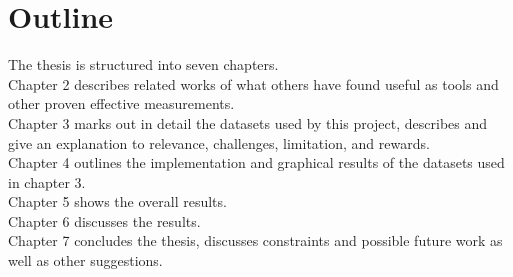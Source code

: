 \section{Outline}
The thesis is structured into seven chapters.
\newline \\Chapter 2 describes related works of what others have found useful as tools and other proven effective measurements.
\newline \\Chapter 3 marks out in detail the datasets used by this project, describes and give an explanation to relevance, challenges, limitation, and rewards.
\newline \\Chapter 4 outlines the implementation and graphical results of the datasets used in chapter 3.
\newline \\Chapter 5 shows the overall results.
\newline \\Chapter 6 discusses the results.
\newline \\Chapter 7 concludes the thesis, discusses constraints and possible future work as well as other suggestions.